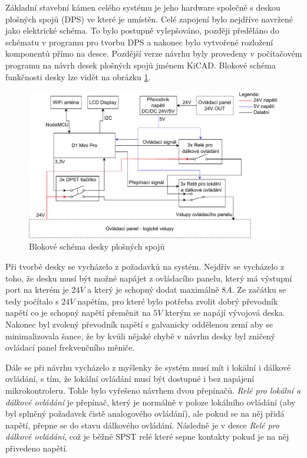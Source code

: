 Základní stavební kámen celého systému je jeho hardware společně s deskou plošných spojů (DPS) ve které je umístěn. Celé zapojení bylo nejdříve navržené jako elektrické schéma. To bylo postupně vylepšováno, později předěláno do schématu v programu pro tvorbu DPS a nakonec bylo vytvořené rozložení komponentů přímo na desce. Pozdější verze návrhu byly provedeny v počítačovém programu na návrh desek plošných spojů jménem KiCAD. Blokové schéma funkčnosti desky lze vidět na obrázku \ref{fig:SchemaDesky}.

\begin{figure}[hptb]
	\centering
	\includegraphics[width=1\linewidth]{images/Electrical_Schematic_V2.drawio.pdf}
	\caption{Blokové schéma desky plošných spojů}
	\label{fig:SchemaDesky}
\end{figure}

Při tvorbě desky se vycházelo z požadavků na systém. Nejdřív se vycházelo z toho, že desku musí být možné napájet z ovládacího panelu, který má výstupní port na kterém je $24V$ a který je schopný dodat maximálně $8A$. Ze začátku se tedy počítalo s $24V$ napětím, pro které bylo potřeba zvolit dobrý převodník napětí co je schopný napětí přeměnit na $5V$ kterým se napájí vývojová deska. Nakonec byl zvolený převodník napětí s galvanicky oddělenou zemí aby se minimalizovala šance, že by kvůli nějaké chybě v návrhu desky byl zničený ovládací panel frekvenčního měniče.
\cite{SiemensG120DGettingStarted}

Dále se při návrhu vycházelo z myšlenky že systém musí mít i lokální i dálkové ovládání, s tím, že lokální ovládání musí být dostupné i bez napájení mikrokontroleru. Tohle bylo vyřešeno návrhem dvou přepínačů. \textit{Relé pro lokální a dálkové ovládání} je přepínač, který je normálně v poloze lokálního ovládání (aby byl splněný požadavek čistě analogového ovládání), ale pokud se na něj přidá napětí, přepne se do stavu dálkového ovládání. Následně je v desce \textit{Relé pro dálkové ovládání}, což je běžné SPST relé které sepne kontakty pokud je na něj přivedeno napětí.

